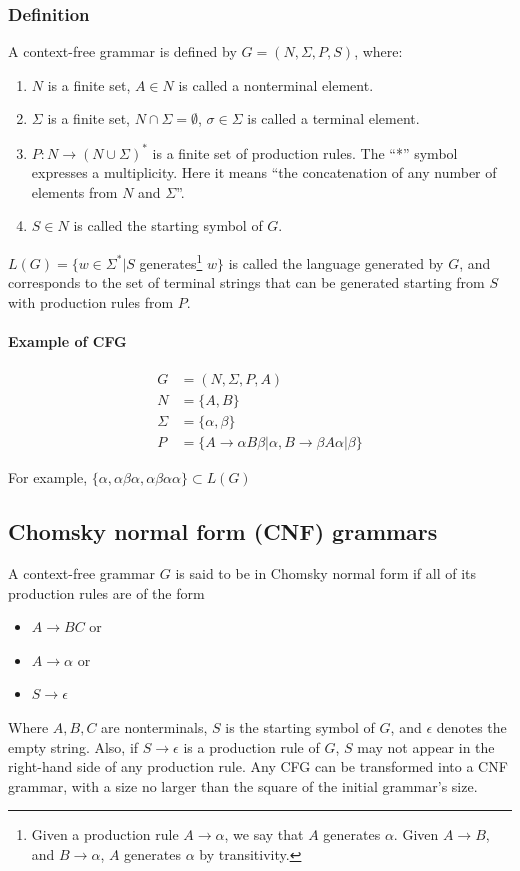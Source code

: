 \documentclass[12pt]{extarticle}
\begin{document}
\begin{multicols}{2}
\subsubsection{Definition}
A context-free grammar is defined by $G=(N,\Sigma,P,S)$, where:\\
\begin{enumerate}
  \item $N$ is a finite set, $A\in N$ is called a nonterminal element.
  \item $\Sigma$ is a finite set, $N\cap\Sigma=\emptyset$, $\sigma\in\Sigma$ is called a terminal element.
  \item $P:N\rightarrow (N\cup \Sigma)^*$ is a finite set of production rules.
    The ``*'' symbol expresses a multiplicity. Here it means ``the concatenation
    of any number of elements from $N$ and $\Sigma$''.
  \item $S\in N$ is called the starting symbol of $G$.
\end{enumerate}
$L(G)=\{w\in \Sigma^*|S$ generates\footnote{Given a production rule
  $A\rightarrow \alpha$, we say that $A$ generates $\alpha$. Given $A\rightarrow
  B$, and $B\rightarrow\alpha$, $A$ generates $\alpha$ by transitivity.} $w\}$
is called the language generated by $G$, and corresponds to the set of
terminal strings that can be generated starting from $S$ with production rules
from $P$.

\paragraph{Example of CFG} 
\begin{align*}
  G&=(N,\Sigma,P,A)\\
  N&=\{A,B\}\\
  \Sigma&=\{\alpha,\beta\}\\
  P&=\{A\rightarrow\alpha B\beta | \alpha, B\rightarrow\beta A\alpha | \beta\}
\end{align*}

For example, $\{\alpha, \alpha\beta\alpha, \alpha\beta\alpha\alpha\}\subset L(G)$


\subsection{Chomsky normal form (CNF) grammars}
A context-free grammar $G$ is said to be in Chomsky normal form if all of its production rules are of the form
\begin{itemize}
\item $A\rightarrow BC$ or
\item $A\rightarrow\alpha$ or
\item $S\rightarrow\epsilon$
\end{itemize}
Where $A,B,C$ are nonterminals, $S$ is the starting symbol of $G$, and $\epsilon$
denotes the empty string. Also,  if $S\rightarrow\epsilon$ is a production
rule of $G$, $S$ may not appear in the right-hand side of any production rule.
Any CFG can be transformed into a CNF grammar, with a size no larger than the square of the initial grammar's size.


\end{multicols}
\end{document}
